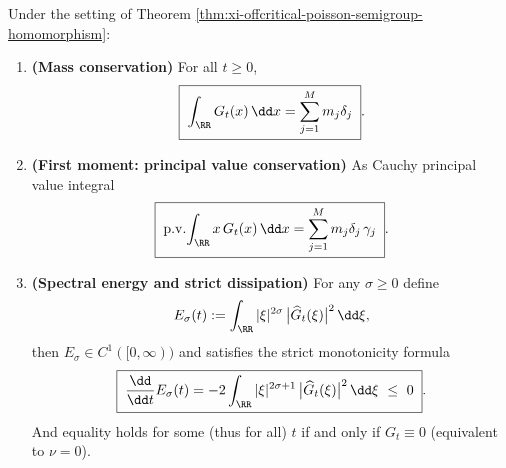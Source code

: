 \begin{theorem}\label{thm:xi-offcritical-poisson-conservation-dissipation}
Under the setting of Theorem \ref{thm:xi-offcritical-poisson-semigroup-homomorphism}:
\begin{enumerate}
  \item \textbf{(Mass conservation)} For all \(t\ge 0\),
  \begin{equation}\label{eq:xi-offcritical-poisson-mass-conservation}
  \boxed{\;\int_{\RR}G_t(x)\,\dd x=\sum_{j=1}^{M}m_j\delta_j\; }.
  \end{equation}
  \item \textbf{(First moment: principal value conservation)} As Cauchy principal value integral
  \begin{equation}\label{eq:xi-offcritical-poisson-first-moment-pv}
  \boxed{\;\mathrm{p.v.}\!\int_{\RR}x\,G_t(x)\,\dd x=\sum_{j=1}^{M}m_j\delta_j\,\gamma_j\; }.
  \end{equation}
  \item \textbf{(Spectral energy and strict dissipation)} For any \(\sigma\ge 0\) define
  \[
  E_\sigma(t):=\int_{\RR}|\xi|^{2\sigma}\,\bigl|\widehat G_t(\xi)\bigr|^2\,\dd\xi,
  \]
  then \(E_\sigma\in C^1([0,\infty))\) and satisfies the strict monotonicity formula
  \begin{equation}\label{eq:xi-offcritical-poisson-energy-dissipation}
  \boxed{\;
  \frac{\dd}{\dd t}E_\sigma(t)
  =-2\int_{\RR}|\xi|^{2\sigma+1}\,\bigl|\widehat G_t(\xi)\bigr|^2\,\dd\xi
  \ \le\ 0\; }.
  \end{equation}
  And equality holds for some (thus for all) \(t\) if and only if \(G_t\equiv 0\) (equivalent to \(\nu=0\)).
\end{enumerate}
\end{theorem}


